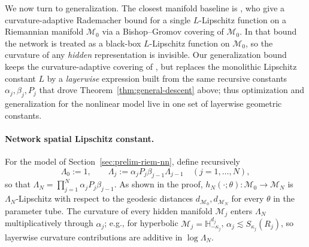 \documentclass[letterpaper]{article}
\begin{document}
We now turn to generalization. The closest manifold baseline is
\cite{sarkar2025learning}, who give a curvature-adaptive Rademacher bound
for a single $L$-Lipschitz function on a Riemannian manifold $\mathcal M_0$
via a Bishop--Gromov covering of $\mathcal M_0$. In that bound the
network is treated as a black-box $L$-Lipschitz function on $\mathcal M_0$,
so the curvature of any \emph{hidden} representation is invisible. Our
generalization bound keeps the curvature-adaptive covering of
\cite{sarkar2025learning}, but replaces the monolithic Lipschitz constant
$L$ by a \emph{layerwise} expression built from the same recursive
constants $\alpha_j, \beta_j, P_j$ that drove
Theorem~\ref{thm:general-descent} above; thus optimization and
generalization for the nonlinear model live in one set of layerwise
geometric constants.

\paragraph{Network spatial Lipschitz constant.}
For the model of Section~\ref{sec:prelim-riem-nn}, define recursively
\begin{equation}
\label{eq:Lambda-recursive}
\Lambda_0 := 1,
\qquad
\Lambda_j := \alpha_j P_j \beta_{j-1} \Lambda_{j-1}
\quad (j=1,\dots,N),
\end{equation}
so that $\Lambda_N = \prod_{j=1}^N \alpha_j P_j \beta_{j-1}$. As shown in
the proof, $h_N(\cdot;\theta) : \mathcal M_0 \to \mathcal M_N$ is
$\Lambda_N$-Lipschitz with respect to the geodesic distances
$d_{\mathcal M_0}, d_{\mathcal M_N}$ for every $\theta$ in the parameter
tube. The curvature of every hidden manifold $\mathcal M_j$ enters
$\Lambda_N$ multiplicatively through $\alpha_j$; e.g., for hyperbolic
$\mathcal M_j = \mathbb H^{d_j}_{-\kappa_j}$,
$\alpha_j \lesssim S_{\kappa_j}(R_j)$, so layerwise curvature
contributions are additive in $\log \Lambda_N$.
\end{document}
